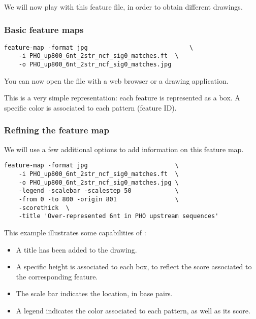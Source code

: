 We will now play with this feature file, in order to obtain different
drawings.

\subsubsection{Basic feature maps}

\begin{verbatim}
feature-map -format jpg                            \
    -i PHO_up800_6nt_2str_ncf_sig0_matches.ft  \
    -o PHO_up800_6nt_2str_ncf_sig0_matches.jpg
\end{verbatim}

You can now open the file
 with a web
browser or a drawing application.

This is a very simple representation: each feature is represented as a
box. A specific color is associated to each pattern (feature ID). 

\subsubsection{Refining the feature map}

We will use a few additional options to add information on this
feature map. 

\begin{verbatim}
feature-map -format jpg                        \
    -i PHO_up800_6nt_2str_ncf_sig0_matches.ft  \
    -o PHO_up800_6nt_2str_ncf_sig0_matches.jpg \
    -legend -scalebar -scalestep 50            \
    -from 0 -to 800 -origin 801                \
    -scorethick  \
    -title 'Over-represented 6nt in PHO upstream sequences' 
\end{verbatim}

This example illustrates some capabilities of :

\begin{itemize}
\item A title has been added to the drawing. 

\item A specific height is associated to each box, to reflect
the score associated to the corresponding feature.

\item The scale bar indicates the location, in base pairs. 

\item A legend indicates the color associated to each pattern, as well 
as its score. 

\end{itemize}

